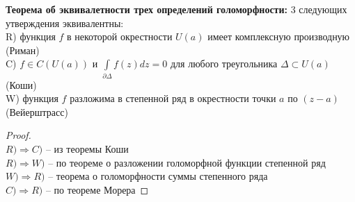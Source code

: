 \textbf{Теорема об эквивалетности трех определений голоморфности:}
3 следующих утверждения эквивалентны:\\[2mm]
R) функция $f$ в некоторой окрестности $U(a)$ имеет комплексную производную (Риман) \\[2mm]
C) $f \in C(U(a))$ и $\int \limits_{\partial \Delta}f(z)dz = 0$ для любого треугольника $\Delta \subset U(a)$ (Коши)\\[2mm] 
W) функция $f$ разложима в степенной ряд в окрестности точки $a$ по $(z-a)$ (Вейерштрасс)


\begin{proof}
	\ \\
	$R) \Rightarrow C)$ -- из теоремы Коши \\[2mm]
	$R) \Rightarrow W)$ -- по теореме о разложении голоморфной функции степенной ряд \\[2mm]
	$W) \Rightarrow R)$ -- теорема о голоморфности суммы степенного ряда \\[2mm]
	$C) \Rightarrow R)$ -- по теореме Морера
\end{proof}
